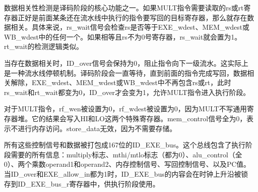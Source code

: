 \documentclass[a4paper]{article}
\begin{document}
	数据相关性检测是译码阶段的核心功能之一。如果MULT指令需要读取的rs或rt寄存器正好是前面某条还在流水线中执行的指令要写回的目标寄存器，那么就存在数据相关。具体来说，rs\_wait信号会检查rs是否等于EXE\_wdest、MEM\_wdest或WB\_wdest中的任何一个。如果相等且rs不为0号寄存器，rs\_wait就会置为1。rt\_wait的检测逻辑类似。
	
	当存在数据相关时，ID\_over信号会保持为0，阻止指令向下一级流水。这实际上是一种流水线停顿机制。译码阶段会一直等待，直到前面的指令完成写回，数据相关解除，EXE\_wdest、MEM\_wdest或WB\_wdest中不再包含rs或rt，此时rs\_wait和rt\_wait都变为0，ID\_over才会变为1，允许MULT指令进入执行阶段。
	
	对于MULT指令，rf\_wen被设置为0，rf\_wdest被设置为0，因为MULT不写通用寄存器堆。它的结果会写入HI和LO这两个特殊寄存器。mem\_control信号全为0，表示不进行内存访问。store\_data无效，因为不需要存储。
	
	所有这些控制信号和数据被打包成167位的ID\_EXE\_bus。这个总线包含了执行阶段需要的所有信息：multiply标志、mthi/mtlo标志（都为0）、alu\_control（全0）、两个乘数operand1和operand2、内存控制信号、写回控制信号、以及PC值。当ID\_over和EXE\_allow\_in都为1时，ID\_EXE\_bus的内容会在时钟上升沿被锁存到ID\_EXE\_bus\_r寄存器中，供执行阶段使用。
\end{document}
